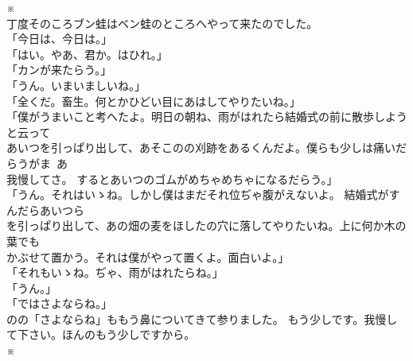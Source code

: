 \documentclass[
a4paper,
10pt,
book]
{tarticle}
\begin{document}
\indent \indent \indent \indent \indent \indent \indent \indent \indent \indent ※\\

丁度そのころブン蛙はベン蛙のところへやって来たのでした。\\
「今日は、今日は。」\\
「はい。やあ、君か。はひれ。」\\
「カンが来たらう。」\\
「うん。いまいましいね。」\\
「全くだ。畜生。何とかひどい目にあはしてやりたいね。」\\
「僕がうまいこと考へたよ。明日の朝ね、雨がはれたら結婚式の前に散歩しようと云って\\
\indent あいつを引っぱり出して、あそこのの刈跡をあるくんだよ。僕らも少しは痛いだらうがま~あ\\
\indent 我慢してさ。
するとあいつのゴムがめちゃめちゃになるだらう。」\\
「うん。それはいゝね。しかし僕はまだそれ位ぢゃ腹がえないよ。
結婚式がすんだらあいつら\\
\indent を引っぱり出して、あの畑の麦をほしたの穴に落してやりたいね。上に何か木の葉でも\\
\indent かぶせて置かう。それは僕がやって置くよ。面白いよ。」\\
「それもいゝね。ぢゃ、雨がはれたらね。」\\
「うん。」\\
「ではさよならね。」\\
\indent {}のの「さよならね」ももう鼻についてきて参りました。
もう少しです。我慢して下さい。ほんのもう少しですから。\\

\indent \indent \indent \indent \indent \indent \indent \indent \indent \indent ※\\
\end{document}
